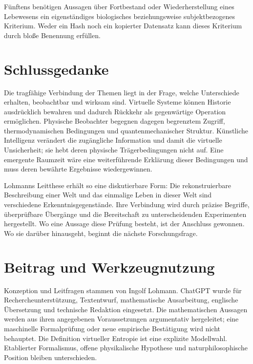 Fünftens benötigen Aussagen über Fortbestand oder Wiederherstellung eines Lebewesens ein eigenständiges biologisches beziehungsweise subjektbezogenes Kriterium. Weder ein Hash noch ein kopierter Datensatz kann dieses Kriterium durch bloße Benennung erfüllen.

\section{Schlussgedanke}\label{de:sec13}
Die tragfähige Verbindung der Themen liegt in der Frage, welche Unterschiede erhalten, beobachtbar und wirksam sind. Virtuelle Systeme können Historie ausdrücklich bewahren und dadurch Rückkehr als gegenwärtige Operation ermöglichen. Physische Beobachter begegnen dagegen begrenztem Zugriff, thermodynamischen Bedingungen und quantenmechanischer Struktur. Künstliche Intelligenz verändert die zugängliche Information und damit die virtuelle Unsicherheit; sie hebt deren physische Trägerbedingungen nicht auf. Eine emergente Raumzeit wäre eine weiterführende Erklärung dieser Bedingungen und muss deren bewährte Ergebnisse wiedergewinnen.

Lohmanns Leitthese erhält so eine diskutierbare Form: Die rekonstruierbare Beschreibung einer Welt und das einmalige Leben in dieser Welt sind verschiedene Erkenntnisgegenstände. Ihre Verbindung wird durch präzise Begriffe, überprüfbare Übergänge und die Bereitschaft zu unterscheidenden Experimenten hergestellt. Wo eine Aussage diese Prüfung besteht, ist der Anschluss gewonnen. Wo sie darüber hinausgeht, beginnt die nächste Forschungsfrage.

\section*{Beitrag und Werkzeugnutzung}
Konzeption und Leitfragen stammen von Ingolf Lohmann. ChatGPT wurde für Rechercheunterstützung, Textentwurf, mathematische Ausarbeitung, englische Übersetzung und technische Redaktion eingesetzt. Die mathematischen Aussagen werden aus ihren angegebenen Voraussetzungen argumentativ hergeleitet; eine maschinelle Formalprüfung oder neue empirische Bestätigung wird nicht behauptet. Die Definition virtueller Entropie ist eine explizite Modellwahl. Etablierter Formalismus, offene physikalische Hypothese und naturphilosophische Position bleiben unterschieden.
\clearpage
\appendix
\renewcommand{\theHsection}{\langtag.appendix.\Alph{section}}
